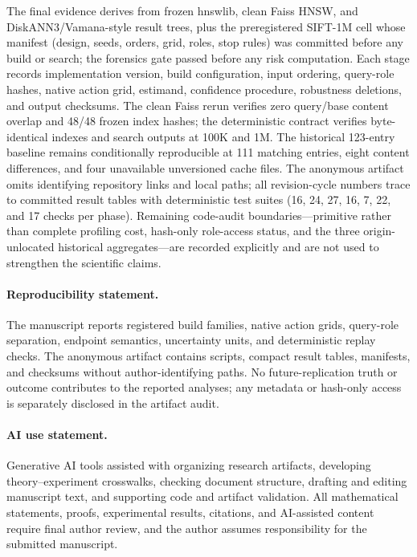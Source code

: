 \documentclass{article}
\begin{document}
The final evidence derives from frozen hnswlib, clean Faiss HNSW, and DiskANN3/Vamana-style result trees,
plus the preregistered SIFT-1M cell whose manifest (design, seeds, orders, grid, roles, stop rules) was
committed before any build or search; the forensics gate passed before any risk computation. Each stage
records implementation version, build configuration, input ordering, query-role hashes, native action
grid, estimand, confidence procedure, robustness deletions, and output checksums. The clean Faiss rerun
verifies zero query/base content overlap and 48/48 frozen index hashes; the deterministic contract verifies
byte-identical indexes and search outputs at 100K and 1M. The historical 123-entry baseline remains
conditionally reproducible at 111 matching entries, eight content differences, and four unavailable
unversioned cache files. The anonymous artifact omits identifying repository links and local paths; all
revision-cycle numbers trace to committed result tables with deterministic test suites (16, 24, 27, 16, 7,
22, and 17 checks per phase). Remaining code-audit boundaries---primitive rather than complete profiling
cost, hash-only role-access status, and the three origin-unlocated historical aggregates---are recorded
explicitly and are not used to strengthen the scientific claims.

\paragraph{Reproducibility statement.}
The manuscript reports registered build families, native action grids, query-role separation, endpoint
semantics, uncertainty units, and deterministic replay checks. The anonymous artifact contains scripts,
compact result tables, manifests, and checksums without author-identifying paths. No future-replication
truth or outcome contributes to the reported analyses; any metadata or hash-only access is separately
disclosed in the artifact audit.

\paragraph{AI use statement.}
Generative AI tools assisted with organizing research artifacts, developing theory--experiment crosswalks,
checking document structure, drafting and editing manuscript text, and supporting code and artifact
validation. All mathematical statements, proofs, experimental results, citations, and AI-assisted content
require final author review, and the author assumes responsibility for the submitted manuscript.
\end{document}
